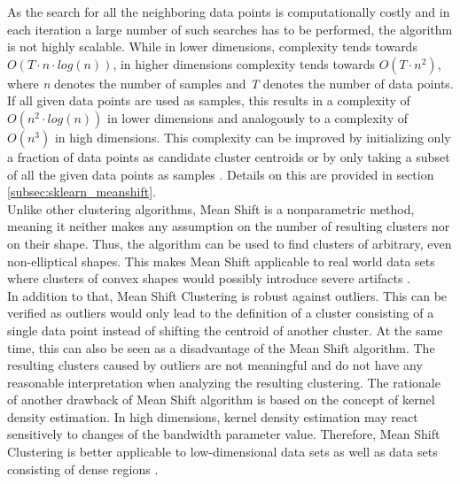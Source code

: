 As the search for all the neighboring data points is computationally costly and in each iteration a large number of such searches has to be performed, the algorithm is not highly scalable. While in lower dimensions, complexity tends towards $O(T \cdot n \cdot log(n))$, in higher dimensions complexity tends towards $O(T \cdot n^{2})$, where \textit{n} denotes the number of samples and \textit{T} denotes the number of data points. If all given data points are used as samples, this results in a complexity of $O(n^{2} \cdot log(n))$ in lower dimensions and analogously to a complexity of $O(n^{3})$ in high dimensions. This complexity can be improved by initializing only a fraction of data points as candidate cluster centroids or by only taking a subset of all the given data points as samples \cite{sklearn_api}. Details on this are provided in section \ref{subsec:sklearn_meanshift}. \\
Unlike other clustering algorithms, Mean Shift is a nonparametric method, meaning it neither makes any assumption on the number of resulting clusters nor on their shape. Thus, the algorithm can be used to find clusters of arbitrary, even non-elliptical shapes. This makes Mean Shift applicable to real world data sets where clusters of convex shapes would possibly introduce severe artifacts \cite{comaniciu2002MeanShift}.\\
In addition to that, Mean Shift Clustering is robust against outliers. This can be verified as outliers would only lead to the definition of a cluster consisting of a single data point instead of shifting the centroid of another cluster.
At the same time, this can also be seen as a disadvantage of the Mean Shift algorithm. The resulting clusters caused by outliers are not meaningful and do not have any reasonable interpretation when analyzing the resulting clustering. 
The rationale of another drawback of Mean Shift algorithm is based on the concept of kernel density estimation. In high dimensions, kernel density estimation may react sensitively to changes of the bandwidth parameter value. Therefore, Mean Shift Clustering is better applicable to low-dimensional data sets as well as data sets consisting of dense regions \cite{CarreiraPerpin2015ARO}.